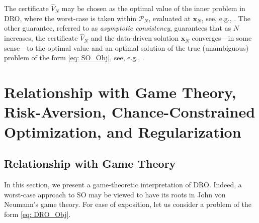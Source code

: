 \documentclass[final,onefignum,onetabnum]{class}
\newcommand{\bs}[1]{\boldsymbol{#1}} %
\newcommand{\Cs}[1]{\mathcal{#1}} %
\newcommand{\dro}{DRO}
\begin{document}
The certificate $\hat{V}_{N}$ may  be chosen as the optimal value of the inner problem in \dro, where the worst-case is taken within $\Cs{P}_{N}$,  evaluated at $\bs{x}_{N}$, see, e.g.,  \cite{mohajerin2018}. %
The other guarantee, referred to as {\it asymptotic consistency}, guarantees that as $N$ increases, the certificate $\hat{V}_{N} $ and the data-driven solution $\bs{x}_{N}$ converges---in some sense---to the optimal value and an optimal solution of the true (unambiguous)  problem of the form  \eqref{eq: SO_Obj}, see, e.g.,  \cite{mohajerin2018}.  


\section[Relationship with Game Theory, Risk-Aversion, Chance-Constrained Optimization, and Regularization]{\texorpdfstring{Relationship with Game Theory, Risk-Aversion, \linebreak Chance-Constrained Optimization, and Regularization}{Relationship with Game Theory, Risk-Aversion, Chance-Constrained Optimization, and Regularization}}

\label{sec: rev.game_risk_chance_reg}

 
\subsection{Relationship with Game Theory}
\label{sec: rev.game_theory}

In this section, we present a game-theoretic interpretation of \dro. Indeed, a worst-case approach to SO may be viewed to have  its roots in John von Neumann's game theory. For ease of exposition, let us consider a problem of the form  \eqref{eq: DRO_Obj}. 
\end{document}
